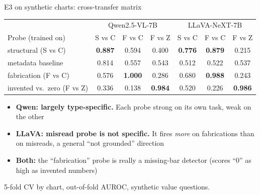 \documentclass[10pt,aspectratio=169]{beamer}
\newcommand{\qwen}{Qwen2.5-VL-7B\xspace}
\newcommand{\llava}{LLaVA-NeXT-7B\xspace}
\newcommand{\cls}[1]{\MakeUppercase{#1}}
\newcommand{\hl}[1]{\alert{\textbf{#1}}}
\begin{document}
\begin{frame}{E3 on synthetic charts: cross-transfer matrix}
\centering
\small
\begin{tabular}{l|ccc|ccc}
\toprule
& \multicolumn{3}{c|}{\qwen} & \multicolumn{3}{c}{\llava} \\
Probe (trained on) & \cls{s} vs \cls{c} & \cls{f} vs \cls{c} & \cls{f} vs \cls{z}
& \cls{s} vs \cls{c} & \cls{f} vs \cls{c} & \cls{f} vs \cls{z} \\
\midrule
structural (\cls{s} vs \cls{c}) & \textbf{0.887} & 0.594 & 0.400 & \textbf{0.776} & \hl{0.879} & 0.215 \\
\quad metadata baseline & 0.814 & 0.557 & 0.543 & 0.512 & 0.522 & 0.537 \\
fabrication (\cls{f} vs \cls{c}) & 0.576 & \textbf{1.000} & 0.286 & 0.680 & \textbf{0.988} & 0.243 \\
invented vs.\ zero (\cls{f} vs \cls{z}) & 0.336 & 0.138 & \textbf{0.984} & 0.520 & 0.226 & \textbf{0.986} \\
\bottomrule
\end{tabular}
\vspace{0.8em}
\raggedright
\begin{itemize}
\item \textbf{Qwen: largely type-specific.} Each probe strong on its own task,
weak on the other
\item \textbf{LLaVA: misread probe is not specific.} It fires \emph{more} on
fabrications than on misreads, a general ``not grounded'' direction
\item \textbf{Both:} the ``fabrication'' probe is really a missing-bar detector
(scores ``0'' as high as invented numbers)
\end{itemize}
{\footnotesize 5-fold CV by chart, out-of-fold AUROC, synthetic value questions.}
\end{frame}
\end{document}
